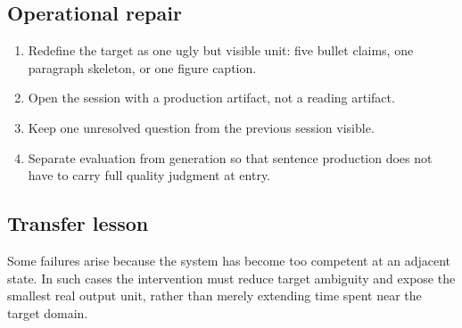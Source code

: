 \subsection*{Operational repair}
\begin{enumerate}[nosep]
  \item Redefine the target as one ugly but visible unit: five bullet claims,
        one paragraph skeleton, or one figure caption.
  \item Open the session with a production artifact, not a reading artifact.
  \item Keep one unresolved question from the previous session visible.
  \item Separate evaluation from generation so that sentence production does
        not have to carry full quality judgment at entry.
\end{enumerate}

\subsection*{Transfer lesson}
Some failures arise because the system has become too competent at an adjacent
state. In such cases the intervention must reduce target ambiguity and expose
the smallest real output unit, rather than merely extending time spent near the
target domain.
